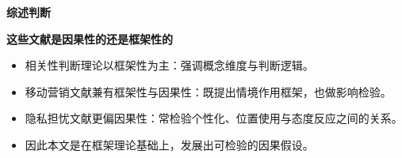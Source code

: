 \documentclass[aspectratio=169,UTF8,zihao=-4]{ctexbeamer}
\newcommand{\bigidea}[1]{
  \begin{center}
    \vspace{0.8em}
    {\LARGE \bfseries #1}
    \vspace{0.6em}
  \end{center}
}
\newcommand{\sectionpageframe}[1]{
  \begin{frame}[plain]
    \begin{center}
      \vfill
      {\Huge \bfseries #1}
      \vfill
    \end{center}
  \end{frame}
}
\begin{document}
\sectionpageframe{综述判断}

\begin{frame}
  \bigidea{这些文献是因果性的还是框架性的}
  \begin{itemize}
    \item \Large 相关性判断理论以框架性为主：强调概念维度与判断逻辑。
    \item \Large 移动营销文献兼有框架性与因果性：既提出情境作用框架，也做影响检验。
    \item \Large 隐私担忧文献更偏因果性：常检验个性化、位置使用与态度反应之间的关系。
    \item \Large 因此本文是在框架理论基础上，发展出可检验的因果假设。
  \end{itemize}
\end{frame}
\end{document}
